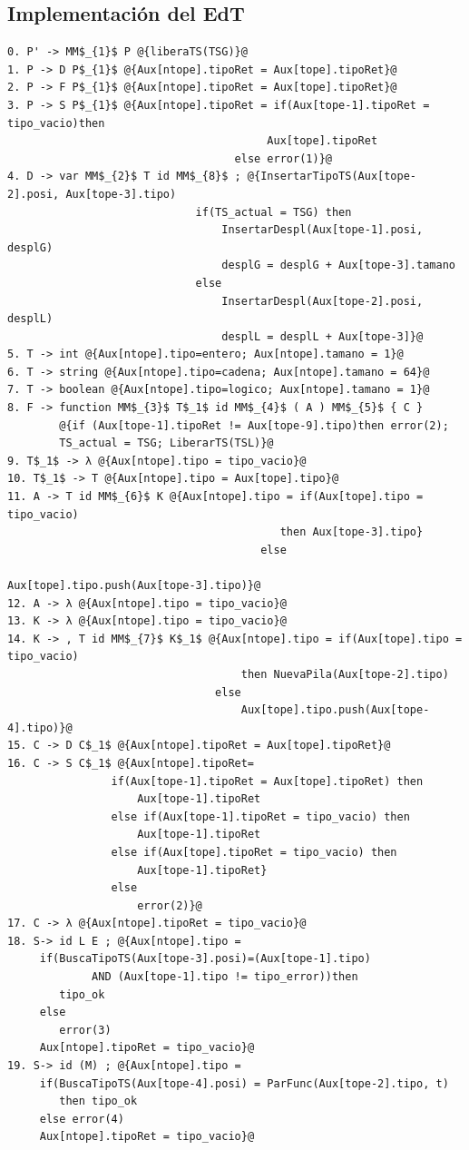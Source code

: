 \subsection{Implementación del EdT}
\begin{lstlisting}[style=EdT]
0. P' -> MM$_{1}$ P @{liberaTS(TSG)}@
1. P -> D P$_{1}$ @{Aux[ntope].tipoRet = Aux[tope].tipoRet}@
2. P -> F P$_{1}$ @{Aux[ntope].tipoRet = Aux[tope].tipoRet}@
3. P -> S P$_{1}$ @{Aux[ntope].tipoRet = if(Aux[tope-1].tipoRet = tipo_vacio)then 
										Aux[tope].tipoRet
								   else error(1)}@
4. D -> var MM$_{2}$ T id MM$_{8}$ ; @{InsertarTipoTS(Aux[tope-2].posi, Aux[tope-3].tipo)
       						 if(TS_actual = TSG) then
           						 InsertarDespl(Aux[tope-1].posi, desplG)
           						 desplG = desplG + Aux[tope-3].tamano
       						 else
           						 InsertarDespl(Aux[tope-2].posi, desplL)
            					 desplL = desplL + Aux[tope-3]}@ 
5. T -> int @{Aux[ntope].tipo=entero; Aux[ntope].tamano = 1}@
6. T -> string @{Aux[ntope].tipo=cadena; Aux[ntope].tamano = 64}@
7. T -> boolean @{Aux[ntope].tipo=logico; Aux[ntope].tamano = 1}@
8. F -> function MM$_{3}$ T$_1$ id MM$_{4}$ ( A ) MM$_{5}$ { C } 
		@{if (Aux[tope-1].tipoRet != Aux[tope-9].tipo)then error(2);
		TS_actual = TSG; LiberarTS(TSL)}@
9. T$_1$ -> λ @{Aux[ntope].tipo = tipo_vacio}@
10. T$_1$ -> T @{Aux[ntope].tipo = Aux[tope].tipo}@
11. A -> T id MM$_{6}$ K @{Aux[ntope].tipo = if(Aux[tope].tipo = tipo_vacio)
										  then Aux[tope-3].tipo}
									   else
										  Aux[tope].tipo.push(Aux[tope-3].tipo)}@
12. A -> λ @{Aux[ntope].tipo = tipo_vacio}@
13. K -> λ @{Aux[ntope].tipo = tipo_vacio}@
14. K -> , T id MM$_{7}$ K$_1$ @{Aux[ntope].tipo = if(Aux[tope].tipo = tipo_vacio)
                    				then NuevaPila(Aux[tope-2].tipo)
             					else
                    				Aux[tope].tipo.push(Aux[tope-4].tipo)}@
15. C -> D C$_1$ @{Aux[ntope].tipoRet = Aux[tope].tipoRet}@           
16. C -> S C$_1$ @{Aux[ntope].tipoRet=
        		if(Aux[tope-1].tipoRet = Aux[tope].tipoRet) then
            		Aux[tope-1].tipoRet
        		else if(Aux[tope-1].tipoRet = tipo_vacio) then
            		Aux[tope-1].tipoRet
        		else if(Aux[tope].tipoRet = tipo_vacio) then
            		Aux[tope-1].tipoRet}
        		else
            		error(2)}@   
17. C -> λ @{Aux[ntope].tipoRet = tipo_vacio}@
18. S-> id L E ; @{Aux[ntope].tipo =
     if(BuscaTipoTS(Aux[tope-3].posi)=(Aux[tope-1].tipo)
    		 AND (Aux[tope-1].tipo != tipo_error))then
        tipo_ok
     else
        error(3)
     Aux[ntope].tipoRet = tipo_vacio}@
19. S-> id (M) ; @{Aux[ntope].tipo =
     if(BuscaTipoTS(Aux[tope-4].posi) = ParFunc(Aux[tope-2].tipo, t)
        then tipo_ok
     else error(4)
     Aux[ntope].tipoRet = tipo_vacio}@
     

\end{lstlisting}
